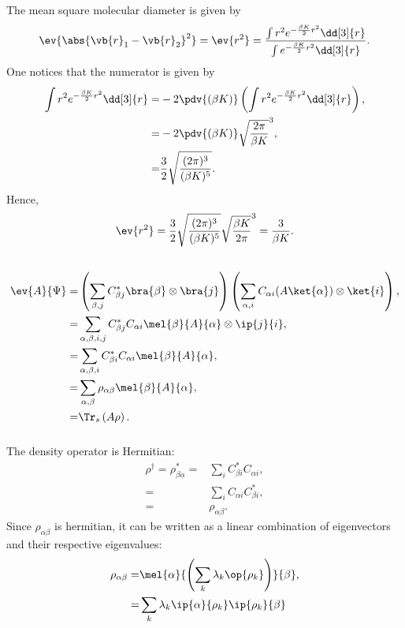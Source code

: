\documentclass[a4paper,12pt,twoside]{article}
\begin{document}
\begin{multicols*}{2}
\subsubsection{}
The mean square molecular diameter is given by
\begin{equation}
	\ev{\abs{\vb{r}_1-\vb{r}_2}^2} = \ev{r^2}
	= \frac{\int r^2 e^{-\frac{\beta K}{2}r^2}\dd[3]{r}}{\int e^{-\frac{\beta K}{2}r^2}\dd[3]{r}}.
\end{equation}
One notices that the numerator is given by
\begin{align}
	\int r^2 e^{-\frac{\beta K}{2}r^2}\dd[3]{r} =& -2\pdv{(\beta K)}\left( \int r^2 e^{-\frac{\beta K}{2}r^2}\dd[3]{r} \right),\\
	=& -2\pdv{(\beta K)} \sqrt{\frac{2\pi}{\beta K}}^3,\\
	=& \frac{3}{2}\sqrt{\frac{(2\pi)^3}{(\beta K)^5}}.
\end{align}
Hence,
\begin{equation}
	\ev{r^2} = \frac{3}{2}\sqrt{\frac{(2\pi)^3}{(\beta K)^5}} \sqrt{\frac{\beta K}{2\pi}}^3
	= \frac{3}{\beta K}.
\end{equation}
\subsection{}%
\subsubsection{}
\begin{align}
	\ev{A}{\Psi} =& \left(\sum_{\beta,j}C_{\beta j}^* \bra{\beta}\otimes\bra{j}\right) \left(\sum_{\alpha,i}C_{\alpha i} (A\ket{\alpha})\otimes\ket{i}\right),\\
	=& \sum_{\alpha,\beta,i,j} C_{\beta j}^*C_{\alpha i} \mel{\beta}{A}{\alpha}\otimes\ip{j}{i},\\
	=& \sum_{\alpha,\beta,i} C_{\beta i}^*C_{\alpha i} \mel{\beta}{A}{\alpha},\\
	=& \sum_{\alpha,\beta} \rho_{\alpha\beta} \mel{\beta}{A}{\alpha},\\
	=& \Tr_s\left(A\rho\right).\\
\end{align}
\subsubsection{}
The density operator is Hermitian:
\begin{align}
	\rho^\dagger= \rho_{\beta\alpha}^* =& \sum_{i} C_{\beta i}^*C_{\alpha i},\\
	=& \sum_{i} C_{\alpha i}C_{\beta i}^*,\\
	=& \rho_{\alpha\beta}.
\end{align}
Since $\rho_{\alpha\beta}$ is hermitian, it can be written as a linear combination of eigenvectors and their respective eigenvalues:
\begin{align}
	\rho_{\alpha\beta} =& \mel{\alpha}{\left(\sum_k \lambda_k \op{\rho_k}\right)}{\beta},\\
	=& \sum_k \lambda_k \ip{\alpha}{\rho_k}\ip{\rho_k}{\beta}
\end{align}

\end{multicols*}
\end{document}
